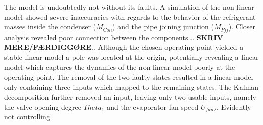 The model is undoubtedly not without its faults. A simulation of the non-linear model showed severe inaccuracies with regards to the behavior of the refrigerant masses inside the condenser ($M_{Con}$) and the pipe joining junction ($M_{Pjj}$). Closer analysis revealed poor connection between the components... \textbf{SKRIV MERE/FÆRDIGGØRE}.. Although the chosen operating point yielded a stable linear model a pole was located at the origin, potentially revealing a linear model which captures the dynamics of the non-linear model poorly at the operating point. The removal of the two faulty states resulted in a linear model only containing three inputs which mapped to the remaining states. The Kalman decomposition further removed an input, leaving only two usable inputs, namely the valve opening degree $Theta_1$ and the evaporator fan speed $U_{fan2}$. Evidently not controlling
